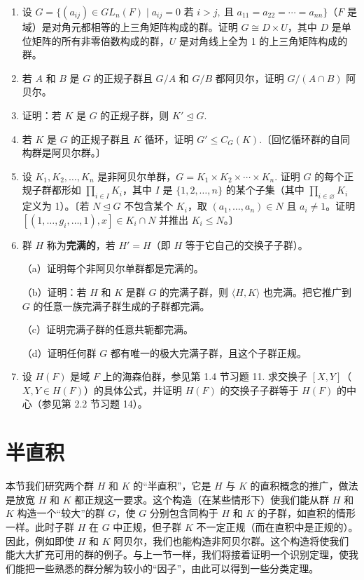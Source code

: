 \begin{enumerate}
\item 设 \(G = \{(a_{ij}) \in GL_n(F) \mid a_{ij} = 0 \text{ 若 } i > j,\ \text{且 } a_{11} = a_{22} = \cdots = a_{nn}\}\)（\(F\) 是域）是对角元都相等的上三角矩阵构成的群。证明 \(G \cong D \times U\)，其中 \(D\) 是单位矩阵的所有非零倍数构成的群，\(U\) 是对角线上全为 1 的上三角矩阵构成的群。

\item 若 \(A\) 和 \(B\) 是 \(G\) 的正规子群且 \(G/A\) 和 \(G/B\) 都阿贝尔，证明 \(G/(A \cap B)\) 阿贝尔。

\item 证明：若 \(K\) 是 \(G\) 的正规子群，则 \(K' \trianglelefteq G\).

\item 若 \(K\) 是 \(G\) 的正规子群且 \(K\) 循环，证明 \(G' \leq C_G(K)\).〔回忆循环群的自同构群是阿贝尔群。〕

\item 设 \(K_1, K_2, \ldots, K_n\) 是非阿贝尔单群，\(G = K_1 \times K_2 \times \cdots \times K_n\). 证明 \(G\) 的每个正规子群都形如 \(\prod_{i \in I} K_i\)，其中 \(I\) 是 \(\{1, 2, \ldots, n\}\) 的某个子集（其中 \(\prod_{i \in \varnothing} K_i\) 定义为 1）。〔若 \(N \trianglelefteq G\) 不包含某个 \(K_i\)，取 \((a_1, \ldots, a_n) \in N\) 且 \(a_i \neq 1\)。证明 \([(1, \ldots, g_i, \ldots, 1), x] \in K_i \cap N\) 并推出 \(K_i \leq N\)。〕

\item 群 \(H\) 称为\textbf{完满的}，若 \(H' = H\)（即 \(H\) 等于它自己的交换子子群）。

（a）证明每个非阿贝尔单群都是完满的。

（b）证明：若 \(H\) 和 \(K\) 是群 \(G\) 的完满子群，则 \(\langle H, K \rangle\) 也完满。把它推广到 \(G\) 的任意一族完满子群生成的子群都完满。

（c）证明完满子群的任意共轭都完满。

（d）证明任何群 \(G\) 都有唯一的极大完满子群，且这个子群正规。

\item 设 \(H(F)\) 是域 \(F\) 上的海森伯群，参见第 1.4 节习题 11. 求交换子 \([X, Y]\)（\(X, Y \in H(F)\)）的具体公式，并证明 \(H(F)\) 的交换子子群等于 \(H(F)\) 的中心（参见第 2.2 节习题 14）。
\end{enumerate}

\section{半直积}

本节我们研究两个群 \(H\) 和 \(K\) 的“半直积”，它是 \(H\) 与 \(K\) 的直积概念的推广，做法是放宽 \(H\) 和 \(K\) 都正规这一要求。这个构造（在某些情形下）使我们能从群 \(H\) 和 \(K\) 构造一个“较大”的群 \(G\)，使 \(G\) 分别包含同构于 \(H\) 和 \(K\) 的子群，如直积的情形一样。此时子群 \(H\) 在 \(G\) 中正规，但子群 \(K\) 不一定正规（而在直积中是正规的）。因此，例如即使 \(H\) 和 \(K\) 阿贝尔，我们也能构造非阿贝尔群。这个构造将使我们能大大扩充可用的群的例子。与上一节一样，我们将接着证明一个识别定理，使我们能把一些熟悉的群分解为较小的“因子”，由此可以得到一些分类定理。

